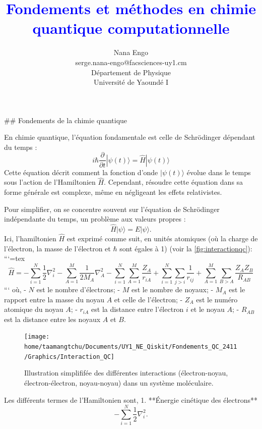 \documentclass[12pt,a4paper]{report}
\title{\textcolor{blue}{Fondements et méthodes en chimie quantique computationnelle}}
\author{Nana Engo\\serge.nana-engo@facsciences-uy1.cm\\
Département de Physique\\ Université de Yaoundé I}
\date{
 \vspace{5cm} %
\begin{center}
\texttt{[image: Neo\_logo.jpg]}
\end{center}
Novembre 2024
}%
\begin{document}
\pagestyle{logo}

\renewcommand{\arraystretch}{1.2}

\maketitle\begin{markdown}


## Fondements de la chimie quantique


En chimie quantique, l'équation fondamentale est celle de Schrödinger dépendant du temps :
\[
i\hbar \frac{\partial}{\partial t} |\psi(t)\rangle = \hat{H} |\psi(t)\rangle 
\]
Cette équation décrit comment la fonction d'onde \(|\psi(t)\rangle\) évolue dans le temps sous l'action de l'Hamiltonien \(\hat{H}\). Cependant, résoudre cette équation dans sa forme générale est complexe, même en négligeant les effets relativistes.

Pour simplifier, on se concentre souvent sur l'équation de Schrödinger indépendante du temps, un problème aux valeurs propres :
\[
\hat{H} |\psi\rangle = E |\psi\rangle .
\]
Ici, l’hamiltonien \(\hat{H}\) est exprimé comme suit, en unités atomiques (où la charge de l'électron, la masse de l'électron et \(\hbar\) sont égales à 1) (voir la \autoref{fig:interactionqc}):
```{=tex}
\[
\hat{H} = -\sum_{i=1}^N \frac{1}{2} \nabla_i^2 - \sum_{A=1}^M \frac{1}{2M_A} \nabla_A^2 - \sum_{i=1}^N \sum_{A=1}^M \frac{Z_A}{r_{iA}} + \sum_{i=1}^N \sum_{j>i} \frac{1}{r_{ij}} + \sum_{A=1}^M \sum_{B>A} \frac{Z_A Z_B}{R_{AB}}
\]
```
où,
- \(N\) est le nombre d'électrons;
- \(M\) est le nombre de noyaux;
- \(M_A\) est le rapport entre la masse du noyau \(A\) et celle de l'électron;
- \(Z_A\) est le numéro atomique du noyau \(A\);
- \(r_{iA}\) est la distance entre l’électron \(i\) et le noyau \(A\);
- \(R_{AB}\) est la distance entre les noyaux \(A\) et \(B\).

\begin{figure}[tbph]
\centering
\texttt{[image: home/taamangtchu/Documents/UY1\_NE\_Qiskit/Fondements\_QC\_2411/Graphics/Interaction\_QC]}
\caption{Illustration simplififée des différentes interactions (électron-noyau, électron-électron, noyau-noyau) dans un système moléculaire.}
\label{fig:interactionqc}
\end{figure}

Les différents termes de l'Hamiltonien sont,
1. **Énergie cinétique des électrons**
   \[
   -\sum_{i=1}^N \frac{1}{2} \nabla_i^2.
   \]


\end{markdown}
\end{document}
